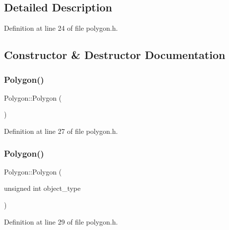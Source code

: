 \subsection{Detailed Description}


Definition at line 24 of file polygon.\+h.



\subsection{Constructor \& Destructor Documentation}
\mbox{\label{class_polygon_ac183e712f8be1e13f1c9d5b4d4512ead}} 
\subsubsection{\texorpdfstring{Polygon()}{Polygon()}\hspace{0.1cm}{\footnotesize\ttfamily [1/4]}}
{\footnotesize\ttfamily Polygon\+::\+Polygon (\begin{DoxyParamCaption}{ }\end{DoxyParamCaption})\hspace{0.3cm}{\ttfamily [inline]}}



Definition at line 27 of file polygon.\+h.

\mbox{\label{class_polygon_a023fe85caf3682e46fb6d15d03da3435}} 
\subsubsection{\texorpdfstring{Polygon()}{Polygon()}\hspace{0.1cm}{\footnotesize\ttfamily [2/4]}}
{\footnotesize\ttfamily Polygon\+::\+Polygon (\begin{DoxyParamCaption}\item[{unsigned int}]{object\+\_\+type }\end{DoxyParamCaption})\hspace{0.3cm}{\ttfamily [inline]}}



Definition at line 29 of file polygon.\+h.

\mbox{\label{class_polygon_aa2a7d4a8a7765c45b834a7ecc198e0c3}} 
